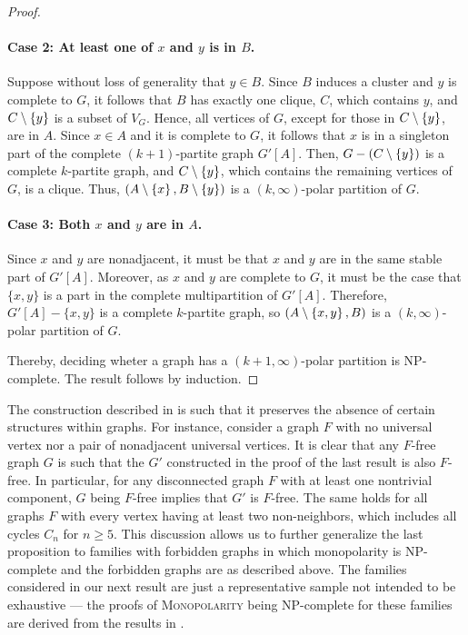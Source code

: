 \begin{proof}
    \paragraph{Case 2: At least one of $x$ and $y$ is in $B$.} Suppose without
    loss of generality that $y\in B$. Since $B$ induces a cluster and $y$ is
    complete to $G$, it follows that $B$ has exactly one clique, $C$, which
    contains $y$, and $C\setminus \left\{y\right\}$ is a subset of $V_G$. Hence, all
    vertices of $G$, except for those in $C\setminus \left\{y\right\}$, are in $A$. Since
    $x\in A$ and it is complete to $G$, it follows that $x$ is in a singleton
    part of the complete $(k+1)$-partite graph $G'[A]$. Then, $G - (C\setminus
    \left\{y\right\})$ is a complete $k$-partite graph, and $C\setminus \left\{y\right\}$, which
    contains the remaining vertices of $G$, is a clique. Thus, $(A\setminus
    \left\{x\right\}, B\setminus \left\{y\right\})$ is a $(k,\infty)$-polar partition of $G$.

    \paragraph{Case 3: Both $x$ and $y$ are in $A$.} Since $x$ and $y$ are
    nonadjacent, it must be that $x$ and $y$ are in the same stable part of
    $G'[A]$.   Moreover, as $x$ and $y$ are complete to $G$, it must be the case
    that $\{x,y\}$ is a part in the complete multipartition of $G'[A]$.
    Therefore, $G'[A] - \{x, y\}$ is a complete $k$-partite graph, so
    $(A\setminus \left\{x,y\right\},B)$ is a $(k,\infty)$-polar partition of $G$.

    Thereby, deciding wheter a graph has a $(k+1,\infty)$-polar partition is
    NP-complete. The result follows by induction.

\end{proof}

The construction described in  is such that it preserves
the absence of certain structures within graphs. For instance, consider a graph
$F$ with no universal vertex nor a pair of nonadjacent universal vertices. It is
clear that any $F$-free graph $G$ is such that the $G'$ constructed in the proof
of the last result is also $F$-free. In particular, for any disconnected graph
$F$ with at least one nontrivial component, $G$ being $F$-free implies that $G'$
is $F$-free. The same holds for all graphs $F$ with every vertex having at least
two non-neighbors, which includes all cycles $C_n$ for $n\geq 5$. This
discussion allows us to further generalize the last proposition to families with
forbidden graphs in which monopolarity is NP-complete and the forbidden graphs
are as described above.   The families considered in our next result are just a
representative sample not intended to be exhaustive --- the proofs of
\textsc{Monopolarity} being NP-complete for these families are derived from the
results in \cite{Le2014}.

